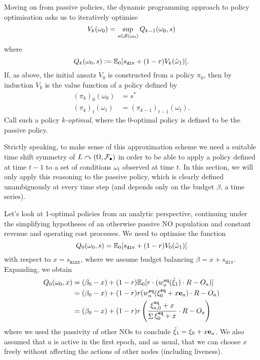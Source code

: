Moving on from passive policies, the dynamic programming approach to policy optimisation asks us to iteratively optimise
\[
  V_k(\omega_0) = \sup_{s\in\mathcal{S}(\omega_0)} Q_{k-1}(\omega_0,s)
\]
%
where
%
\[
  Q_k(\omega_0,s) := \mathbb{E}_0[s_\mathtt{div} + (1-r) V_k(\tilde{\omega}_1) ].
\]
%
If, as above, the initial ansatz $V_0$ is constructed from a policy $\pi_0$, then by induction $V_k$ is the value function of a policy defined by
%
\begin{align*}
  (\pi_k)_0(\omega_0) &= s^* \\
  (\pi_k)_t(\omega_t) &= (\pi_{k-1})_{t-1}(\omega_t).
\end{align*}
%
Call such a policy \emph{$k$-optimal}, where the $0$-optimal policy is defined to be the passive policy.

\begin{remark}

  Strictly speaking, to make sense of this approximation scheme we need a suitable time shift symmetry of $L\curvearrowright(\Omega,\mathcal{F}_\bullet)$ in order to be able to apply a policy defined at time $t-1$ to a set of conditions $\omega_t$ observed at time $t$.
  In this section, we will only apply this reasoning to the passive policy, which is clearly defined unambiguously at every time step (and depends only on the budget $\beta$, a time series).

\end{remark}

Let's look at 1-optimal policies from an analytic perspective, continuing under the simplifying hypotheses of an otherwise passive NO population and constant revenue and operating cost processes.
%
We need to optimise the function
%
\[
  Q_0(\omega_0,s) = \mathbb{E}_0[s_\mathtt{div} + (1-r) V_0(\tilde{\omega}_1) ] \\
\]
%
with respect to $x=s_\mathtt{mint}$, where we assume budget balancing $\beta=x+s_\mathtt{div}$.
%
Expanding, we obtain
%
\begin{align*}
  Q_0(\omega_0,x) &= (\beta_0 - x) + (1-r) \mathbb{E}_0[r\cdot (w_a^{\mathtt{eq}}(\tilde{\xi}_1)\cdot R - O_a)] \\
  &= (\beta_0 - x) + (1-r)r(w_a^{\mathtt{eq}}(\xi_0^{\mathtt{eq}} + x\mathbf{e}_a)\cdot R - O_a) \\
  &= (\beta_0 - x) + (1-r)r \left( \frac{\xi_{a,0}^{\mathtt{eq}} + x} {\mathop{\Sigma}\xi_0^{\mathtt{eq}} + x} \cdot R - O_a \right)
\end{align*}
%
where we used the passivity of other NOs to conclude $\tilde{\xi}_1= \xi_0 + x\mathbf{e}_a $.
%
We also assumed that $a$ is active in the first epoch, and as usual, that we can choose $x$ freely without affecting the actions of other nodes (including liveness).

